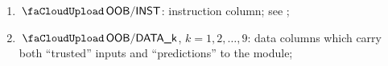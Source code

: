 \begin{enumerate}[resume]
	\item $\miscOobInst$:
		\oobMod{} instruction column; see ;
	\item $\miscOobDataCol{k}$, $k=1, 2, \dots, 9$:
		data columns which carry both ``trusted'' inputs and ``predictions'' to the \oobMod{} module;
\end{enumerate}
